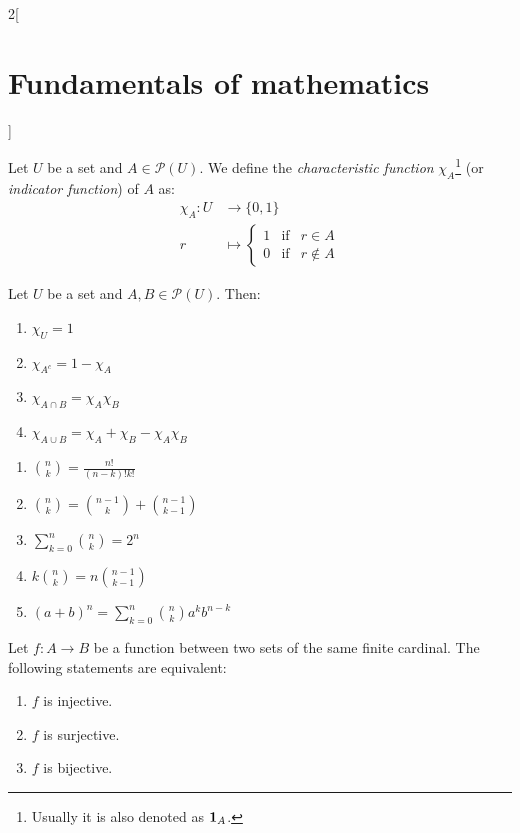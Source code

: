 \documentclass[../../../main.tex]{subfiles}
\begin{document}
\begin{multicols}{2}[\section{Fundamentals of mathematics}]
  \begin{definition}
    Let $U$ be a set and $A\in\mathcal{P}(U)$. We define the \emph{characteristic function} $\chi_A$\footnote{Usually it is also denoted as $\boldsymbol{\mathrm{1}}_A$.} (or \emph{indicator function}) of $A$ as:
    \begin{align*}
      \chi_A:U & \longrightarrow\{0,1\} \\
      r        & \longmapsto \left\{
      \begin{array}{rcl}
        1 & \text{if} & r\in A    \\
        0 & \text{if} & r\notin A
      \end{array}\right.
    \end{align*}
  \end{definition}
  \begin{prop}
    Let $U$ be a set and $A,B\in\mathcal{P}(U)$. Then:
    \begin{enumerate}
      \item $\chi_U=1$
      \item $\chi_{A^c}=1-\chi_A$
      \item $\chi_{A\cap B}=\chi_A\chi_B$
      \item $\chi_{A\cup B}=\chi_A+\chi_B-\chi_A\chi_B$
    \end{enumerate}
  \end{prop}
  \begin{prop}\hfill
    \begin{enumerate}
      \item $\binom{n}{k}=\frac{n!}{(n-k)!k!}$
      \item $\binom{n}{k}=\binom{n-1}{k}+\binom{n-1}{k-1}$
      \item $\sum_{k=0}^n\binom{n}{k}=2^n$
      \item $k\binom{n}{k}=n\binom{n-1}{k-1}$
      \item $(a+b)^n=\sum_{k=0}^n\binom{n}{k}a^kb^{n-k}$
    \end{enumerate}
  \end{prop}
  \begin{prop}
    Let $f:A\rightarrow B$ be a function between two sets of the same finite cardinal. The following statements are equivalent:
    \begin{enumerate}
      \item $f$ is injective.
      \item $f$ is surjective.
      \item $f$ is bijective.
    \end{enumerate}

\end{prop}
\end{multicols}
\end{document}
